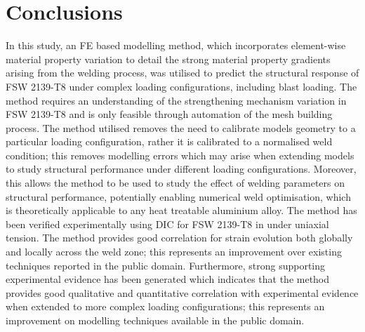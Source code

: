 \section{Conclusions}
\label{Conclusion}
In this study, an FE based modelling method, which incorporates element-wise material property variation to detail the strong material property gradients arising from the welding process, was utilised to predict the structural response of FSW 2139-T8 under complex loading configurations, including blast loading. The method requires an understanding of the strengthening mechanism variation in FSW 2139-T8 and is only feasible through automation of the mesh building process. The method utilised removes the need to calibrate models geometry to a particular loading configuration, rather it is calibrated to a normalised weld condition; this removes modelling errors which may arise when extending models to study structural performance under different loading configurations. Moreover, this allows the method to be used to study the effect of welding parameters on structural performance, potentially enabling numerical weld optimisation, which is theoretically applicable to any heat treatable aluminium alloy. The method has been verified experimentally using DIC for FSW 2139-T8 in under uniaxial tension. The method provides good correlation for strain evolution both globally and locally across the weld zone; this represents an improvement over existing techniques reported in the public domain. Furthermore, strong supporting experimental evidence has been generated which indicates that the method provides good qualitative and quantitative correlation with experimental evidence when extended to more complex loading configurations; this represents an improvement on modelling techniques available in the public domain.
%
